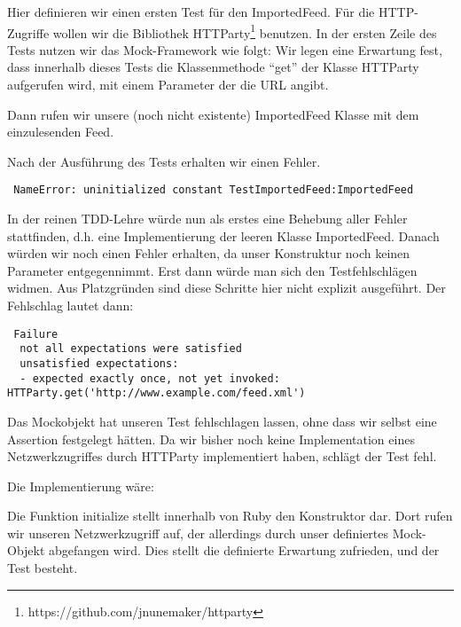 Hier definieren wir einen ersten Test für den ImportedFeed. Für die HTTP-Zugriffe wollen wir die Bibliothek HTTParty\footnote{https://github.com/jnunemaker/httparty} benutzen. In der ersten Zeile des Tests nutzen wir das Mock-Framework wie folgt: Wir legen eine Erwartung fest, dass innerhalb dieses Tests die Klassenmethode "`get"' der Klasse HTTParty aufgerufen wird, mit einem Parameter der die URL angibt.

Dann rufen wir unsere (noch nicht existente) ImportedFeed Klasse mit dem einzulesenden Feed.
\tddred

Nach der Ausführung des Tests erhalten wir einen Fehler.
\begin{lstlisting}
 NameError: uninitialized constant TestImportedFeed:ImportedFeed
\end{lstlisting}
In der reinen TDD-Lehre würde nun als erstes eine Behebung aller Fehler stattfinden, d.h. eine Implementierung der leeren Klasse ImportedFeed. Danach würden wir noch einen Fehler erhalten, da unser Konstruktur noch keinen Parameter entgegennimmt. Erst dann würde man sich den Testfehlschlägen widmen. Aus Platzgründen sind diese Schritte hier nicht explizit ausgeführt. Der Fehlschlag lautet dann:

\begin{lstlisting}
 Failure
  not all expectations were satisfied
  unsatisfied expectations:
  - expected exactly once, not yet invoked: HTTParty.get('http://www.example.com/feed.xml')
\end{lstlisting}
Das Mockobjekt hat unseren Test fehlschlagen lassen, ohne dass wir selbst eine Assertion festgelegt hätten. Da wir bisher noch keine Implementation eines Netzwerkzugriffes durch HTTParty implementiert haben, schlägt der Test fehl.

Die Implementierung wäre:
\begin{ruby}[label=lib/imported\_feed.rb]
 

 
   
\end{ruby}

\tddgreen
Die Funktion initialize stellt innerhalb von Ruby den Konstruktor dar. Dort rufen wir unseren Netzwerkzugriff auf, der allerdings durch unser definiertes Mock-Objekt abgefangen wird. Dies stellt die definierte Erwartung zufrieden, und der Test besteht.



